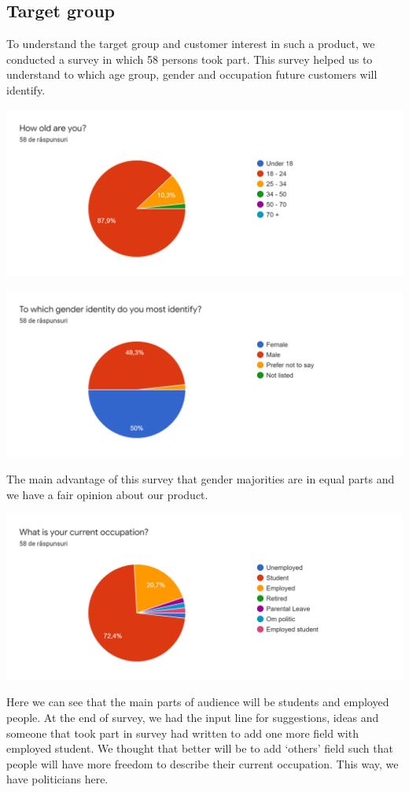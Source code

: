 \subsection{Target group}
\par To understand the target group and customer interest in such a product, we conducted a survey in which 58 persons took part. This survey helped us to understand to which age group, gender and occupation future customers will identify.  
\par
\includegraphics[width=\textwidth]{TargetGroup1}
\par
\includegraphics[width=\textwidth]{TargetGroup2}
\par The main advantage of this survey that gender majorities are in equal parts and we have a fair opinion about our product. 
\par
\includegraphics[width=\textwidth]{TargetGroup3}
\par Here we can see that the main parts of audience will be students and employed people. At the end of survey, we had the input line for suggestions, ideas and someone that took part in survey had written to add one more field with employed student. We thought that better will be to add ‘others’ field such that people will have more freedom to describe their current occupation. This way, we have politicians here. 
